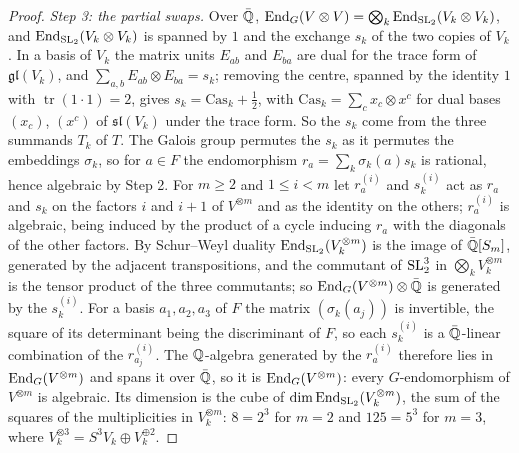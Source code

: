 \begin{proof}
\emph{Step 3: the partial swaps.} Over $\bar{\mathbb{Q}}$,
$\operatorname{End}_{G}(V\otimes V)=\bigotimes_{k}\operatorname{End}_{\operatorname{SL}_{2}}(V_{k}\otimes V_{k})$, and
$\operatorname{End}_{\operatorname{SL}_{2}}(V_{k}\otimes V_{k})$ is spanned by $1$ and the exchange $s_{k}$
of the two copies of $V_{k}$. In a basis of $V_{k}$ the matrix units
$E_{ab}$ and $E_{ba}$ are dual for the trace form of $\mathfrak{gl}(V_{k})$,
and $\sum_{a,b}E_{ab}\otimes E_{ba}=s_{k}$; removing the centre, spanned by the
identity $1$ with $\operatorname{tr}(1\cdot1)=2$, gives
$s_{k}=\mathrm{Cas}_{k}+\frac12$, with $\mathrm{Cas}_{k}=\sum_{c}x_{c}\otimes
x^{c}$ for dual bases $(x_{c})$, $(x^{c})$ of $\mathfrak{sl}(V_{k})$ under the
trace form. So the $s_{k}$ come from the three summands $T_{k}$ of $T$. The Galois group permutes the $s_{k}$ as it
permutes the embeddings $\sigma_{k}$, so for $a\in F$ the endomorphism
$r_{a}=\sum_{k}\sigma_{k}(a)s_{k}$ is rational, hence algebraic by Step 2. For
$m\ge2$ and $1\le i<m$ let $r_{a}^{(i)}$ and $s_{k}^{(i)}$ act as $r_{a}$ and
$s_{k}$ on the factors $i$ and $i+1$ of $V^{\otimes m}$ and as the identity on
the others; $r_{a}^{(i)}$ is algebraic, being induced by the product of a cycle
inducing $r_{a}$ with the diagonals of the other factors. By Schur--Weyl
duality $\operatorname{End}_{\operatorname{SL}_{2}}(V_{k}^{\otimes m})$ is the image of
$\bar{\mathbb{Q}}[S_{m}]$, generated by the adjacent transpositions, and the
commutant of $\operatorname{SL}_{2}^{3}$ in $\bigotimes_{k}V_{k}^{\otimes m}$ is the tensor
product of the three commutants; so $\operatorname{End}_{G}(V^{\otimes m})\otimes\bar{\mathbb{Q}}$
is generated by the $s_{k}^{(i)}$. For a basis $a_{1},a_{2},a_{3}$ of $F$ the
matrix $(\sigma_{k}(a_{j}))$ is invertible, the square of its determinant being
the discriminant of $F$, so each $s_{k}^{(i)}$ is a $\bar{\mathbb{Q}}$-linear
combination of the $r_{a_{j}}^{(i)}$. The $\mathbb{Q}$-algebra generated by the
$r_{a}^{(i)}$ therefore lies in $\operatorname{End}_{G}(V^{\otimes m})$ and spans it over
$\bar{\mathbb{Q}}$, so it is $\operatorname{End}_{G}(V^{\otimes m})$: every $G$-endomorphism of
$V^{\otimes m}$ is algebraic. Its dimension is the cube of
$\dim\operatorname{End}_{\operatorname{SL}_{2}}(V_{k}^{\otimes m})$, the sum of the squares of the
multiplicities in $V_{k}^{\otimes m}$: $8=2^{3}$ for $m=2$ and $125=5^{3}$ for
$m=3$, where $V_{k}^{\otimes3}=S^{3}V_{k}\oplus V_{k}^{\oplus2}$.


\end{proof}
